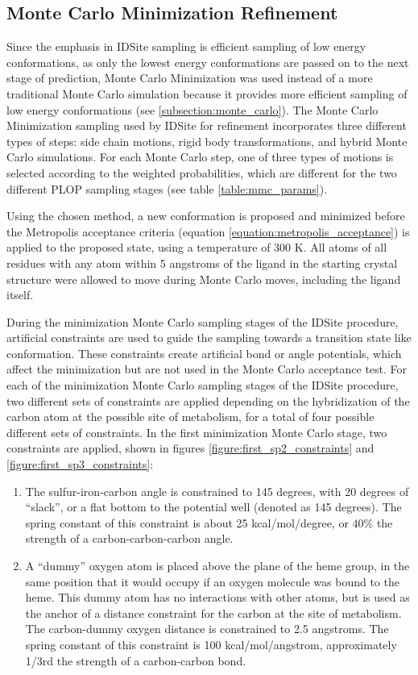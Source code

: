 \subsection{Monte Carlo Minimization Refinement}
\label{subsection:p450/mcm}
Since the emphasis in IDSite sampling is efficient sampling of low energy conformations, as only the lowest energy conformations are passed on to the next stage of prediction, Monte Carlo Minimization was used instead of a more traditional Monte Carlo simulation because it provides more efficient sampling of low energy conformations (see \ref{subsection:monte_carlo}).
The Monte Carlo Minimization sampling used by IDSite for refinement incorporates three different types of steps: side chain motions, rigid body transformations, and hybrid Monte Carlo simulations.
For each Monte Carlo step, one of three types of motions is selected according to the weighted probabilities, which are different for the two different PLOP sampling stages (see table \ref{table:mmc_params}).

Using the chosen method, a new conformation is proposed and minimized before the Metropolis acceptance criteria (equation \ref{equation:metropolis_acceptance}) is applied to the proposed state, using a temperature of 300 K.
All atoms of all residues with any atom within 5 angstroms of the ligand in the starting crystal structure were allowed to move during Monte Carlo moves, including the ligand itself.

During the minimization Monte Carlo sampling stages of the IDSite procedure, artificial constraints are used to guide the sampling towards a transition state like conformation.
These constraints create artificial bond or angle potentials, which affect the minimization but are not used in the Monte Carlo acceptance test.
For each of the minimization Monte Carlo sampling stages of the IDSite procedure, two different sets of constraints are applied depending on the hybridization of the carbon atom at the possible site of metabolism, for a total of four possible different sets of constraints.
In the first minimization Monte Carlo stage, two constraints are applied, shown in figures \ref{figure:first_sp2_constraints} and \ref{figure:first_sp3_constraints}:
\begin{enumerate}
\item The sulfur-iron-carbon angle is constrained to 145 degrees, with 20 degrees of ``slack'', or a flat bottom to the potential well (denoted as 145 degrees).
The spring constant of this constraint is about 25 kcal/mol/degree, or {\textapprox}40\% the strength of a carbon-carbon-carbon angle.
\item A ``dummy'' oxygen atom is placed above the plane of the heme group, in the same position that it would occupy if an oxygen molecule was bound to the heme.  
This dummy atom has no interactions with other atoms, but is used as the anchor of a distance constraint for the carbon at the site of metabolism.  
The carbon-dummy oxygen distance is constrained to 2.5 angstroms.
The spring constant of this constraint is 100 kcal/mol/angstrom, approximately 1/3rd the strength of a carbon-carbon bond.
\end{enumerate}


